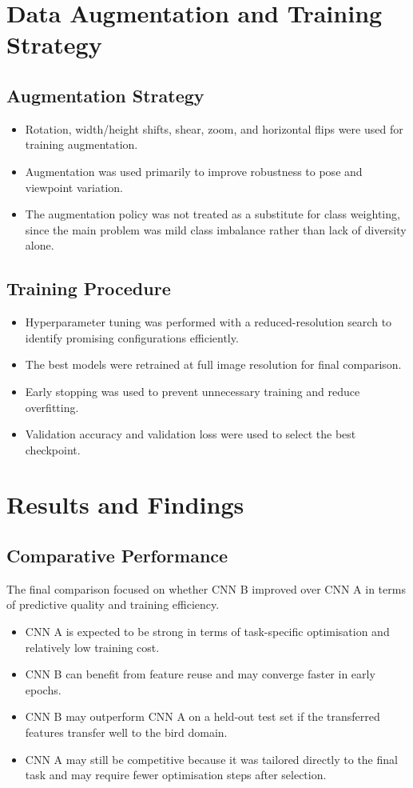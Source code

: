 \documentclass[11pt, a4paper]{report}
\begin{document}
\chapter{Data Augmentation and Training Strategy}
\section{Augmentation Strategy}
\begin{itemize}[leftmargin=1.5em]
    \item Rotation, width/height shifts, shear, zoom, and horizontal flips were used for training augmentation.
    \item Augmentation was used primarily to improve robustness to pose and viewpoint variation.
    \item The augmentation policy was not treated as a substitute for class weighting, since the main problem was mild class imbalance rather than lack of diversity alone.
\end{itemize}

\section{Training Procedure}
\begin{itemize}[leftmargin=1.5em]
    \item Hyperparameter tuning was performed with a reduced-resolution search to identify promising configurations efficiently.
    \item The best models were retrained at full image resolution for final comparison.
    \item Early stopping was used to prevent unnecessary training and reduce overfitting.
    \item Validation accuracy and validation loss were used to select the best checkpoint.
\end{itemize}

\chapter{Results and Findings}
\section{Comparative Performance}
The final comparison focused on whether CNN B improved over CNN A in terms of predictive quality and training efficiency.

\begin{itemize}[leftmargin=1.5em]
    \item CNN A is expected to be strong in terms of task-specific optimisation and relatively low training cost.
    \item CNN B can benefit from feature reuse and may converge faster in early epochs.
    \item CNN B may outperform CNN A on a held-out test set if the transferred features transfer well to the bird domain.
    \item CNN A may still be competitive because it was tailored directly to the final task and may require fewer optimisation steps after selection.
\end{itemize}
\end{document}
